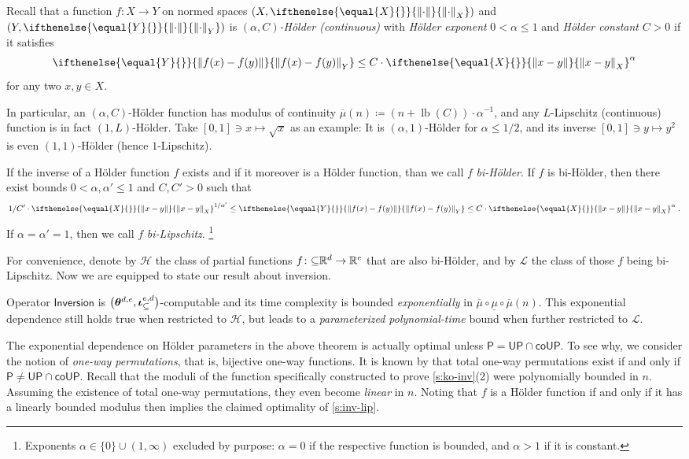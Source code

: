 \documentclass{CSML}
\let\originalleft\left
\let\originalright\right
\renewcommand{\left}{\mathopen{}\mathclose\bgroup\originalleft}
\renewcommand{\right}{\aftergroup\egroup\originalright}
\newcommand{\hfun}{\mathcal{H}}
\newcommand{\lfun}{\mathcal{L}}
\newcommand{\IR}{\mathbb{R}}
\newcommand{\parcol}{\colon\mathnormal\subseteq}
\newcommand{\co}{\mathsf{co}}
\newcommand{\PTime}{\mathsf{P}}
\newcommand{\UPTime}{\mathsf{UP}}
\newcommand{\modcont}{\overline{\mu}}
\newcommand{\modsu}{\underline{\mu}}
\newcommand{\norm}[2][\empty]{
   \ifthenelse{\equal{#1}{\empty}}{%
      \left\|#2\right\|
   }{%
      \left\|#2\right\|_{#1}
   }
}
\newcommand{\normdot}[1][\empty]{\norm[#1]{\cdot}}
\newcommand{\ndot}[1][\empty]{\normdot[#1]}
\newcommand{\dfeq}{\coloneqq}
\newcommand{\dsoinv}{\mathsf{Inversion}}
\DeclareMathOperator{\lb}{lb}
\newcommand{\eqnsp}{\;}
\begin{document}
Recall that a function $f \colon X \to Y$ on normed spaces
$(X,\ndot[X])$ and $(Y,\ndot[Y])$ is \emph{$(\alpha,C)$-Hölder (continuous)}
with \emph{Hölder exponent} $0 < \alpha \leq 1$ and
\emph{Hölder constant} $C > 0$ if it satisfies
\[
	\norm[Y]{f(x)-f(y)} \leq C\cdot\norm[X]{x-y}^\alpha
\]
for any two $x,y \in X$.

In particular, an $(\alpha,C)$-Hölder function has modulus of continuity
$\modcont(n) \dfeq (n + \lb(C)) \cdot \alpha^{-1}$, and any $L$-Lipschitz
(continuous) function is in fact $(1,L)$-Hölder.
Take $[0,1] \ni x \mapsto \sqrt{x}$ as an example:
It is $(\alpha, 1)$-Hölder for $\alpha \leq 1/2$, and its inverse
$[0,1] \ni y \mapsto y^2$ is even $(1,1)$-Hölder (hence $1$-Lipschitz).

If the inverse of a Hölder function $f$ exists and if it moreover is a Hölder
function, than we call $f$ \emph{bi-Hölder}.
If $f$ is bi-Hölder, then there exist bounds $0 < \alpha,\alpha' \leq 1$
and $C,C' > 0$ such that
\[
	1/C' \cdot \norm[X]{x-y}^{1/\alpha'}
	\leq \norm[Y]{f(x) - f(y)}
	\leq C \cdot \norm[X]{x-y}^\alpha
	\eqnsp .
\]
If $\alpha = \alpha' = 1$, then we call $f$ \emph{bi-Lipschitz}.
\footnote{%
	Exponents $\alpha \in \{ 0 \} \cup (1,\infty)$ excluded by purpose:
	$\alpha = 0$ if the respective function is bounded, and
	$\alpha > 1$ if it is constant.
}

For convenience, denote by $\hfun$ the class of partial functions
$f \parcol \IR^d \to \IR^e$ that are also bi-Hölder, and by $\lfun$
the class of those $f$ being bi-Lipschitz.
Now we are equipped to state our result about inversion.

\begin{thm}[complexity of {$\dsoinv$}]
	\label{s:inv-lip}
Operator $\dsoinv$ is $\big(\setinvrep[d,e],\parinvrep[e,d] \big)$-computable
and its time complexity
is bounded \emph{exponentially} in $\modcont \circ \modsu \circ \modcont(n)$.
This exponential dependence still holds true when restricted to $\hfun$,
but leads to a \emph{parameterized polynomial-time} bound when further
restricted to $\lfun$.
\end{thm}

The exponential dependence on Hölder parameters in the above theorem is
actually optimal unless $\PTime = \UPTime \cap \co\UPTime$.
To see why, we consider the notion of \emph{one-way permutations},
that is, bijective one-way functions.
It is known by \cite[Thm.~3.1]{HT03} that total one-way permutations exist if
and only if $\PTime \neq \UPTime \cap \co\UPTime$.
Recall that the moduli of the function specifically constructed to prove
\cref{s:ko-inv}(2) were polynomially bounded in $n$.
Assuming the existence of total one-way permutations, they even become
\emph{linear} in $n$.
Noting that $f$ is a Hölder function if and only if it has a linearly bounded
modulus then implies the claimed optimality of \cref{s:inv-lip}.
\end{document}
